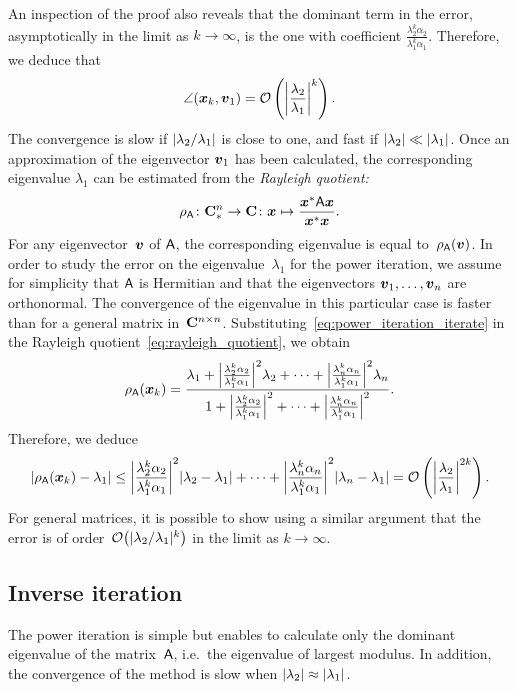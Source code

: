 An inspection of the proof also reveals that the dominant term in the error,
asymptotically in the limit as $k \to \infty$,
is the one with coefficient $\frac{\lambda_2^k \alpha_2}{\lambda_1^k \alpha_1}$.
Therefore, we deduce that
\[
    \angle(\vect x_k, \vect v_1) = \mathcal O \left( \abs*{\frac{\lambda_2}{\lambda_1}}^k \right).
\]
The convergence is slow if $\abs{\lambda_2/\lambda_1}$ is close to one,
and fast if $\abs{\lambda_2} \ll \abs{\lambda_1}$.
Once an approximation of the eigenvector $\vect v_1$ has been calculated,
the corresponding eigenvalue $\lambda_1$ can be estimated from the \emph{Rayleigh quotient:}
\begin{equation}
    \label{eq:rayleigh_quotient}
    \rho_{\mat A}\colon \mat \complex^n_* \to \complex\colon \vect x \mapsto \frac{\vect x^* \mat A \vect x}{\vect x^* \vect x}.
\end{equation}
For any eigenvector~$\vect v$ of $\mat A$,
the corresponding eigenvalue is equal to~$\rho_{\mat A}(\vect v)$.
In order to study the error on the eigenvalue~$\lambda_1$ for the power iteration,
we assume for simplicity that $\mat A$ is Hermitian
and that the eigenvectors $\vect v_1, \dotsc, \vect v_n$ are orthonormal.
The convergence of the eigenvalue in this particular case is faster than for a general matrix in~$\complex^{n \times n}$.
Substituting~\eqref{eq:power_iteration_iterate} in the Rayleigh quotient~\eqref{eq:rayleigh_quotient},
we obtain
\[
    \rho_{\mat A}(\vect x_k)
    = \frac{\lambda_1 + \abs*{ \frac{\lambda_2^k \alpha_2}{\lambda_1^k \alpha_1} }^2 \lambda_2 +  \dotsb + \abs*{ \frac{\lambda_n^k \alpha_n}{\lambda_1^k \alpha_1} }^2 \lambda_n}
    {1 + \abs*{ \frac{\lambda_2^k \alpha_2}{\lambda_1^k \alpha_1} }^2 +  \dotsb +  \abs*{ \frac{\lambda_n^k \alpha_n}{\lambda_1^k \alpha_1} }^2}.
\]
Therefore,
we deduce
\[
    \abs{\rho_{\mat A}(\vect x_k) - \lambda_1}
    \leq  \abs*{ \frac{\lambda_2^k \alpha_2}{\lambda_1^k \alpha_1} }^2 \abs{\lambda_2 - \lambda_1} +  \dotsb + \abs*{ \frac{\lambda_n^k \alpha_n}{\lambda_1^k \alpha_1} }^2 \abs{\lambda_n- \lambda_1}
    = \mathcal O\left(\abs*{\frac{\lambda_2}{\lambda_1}}^{2k}\right).
\]
For general matrices,
it is possible to show using a similar argument
that the error is of order~$\mathcal O\bigl(\abs{\lambda_2/\lambda_1}^k\bigr)$
in the limit as $k \to \infty$.

\subsection{Inverse iteration}
The power iteration is simple but enables to calculate only the dominant eigenvalue of the matrix~$\mat A$,
i.e.\ the eigenvalue of largest modulus.
In addition, the convergence of the method is slow when $\abs{\lambda_2} \approx \abs{\lambda_1}$.

